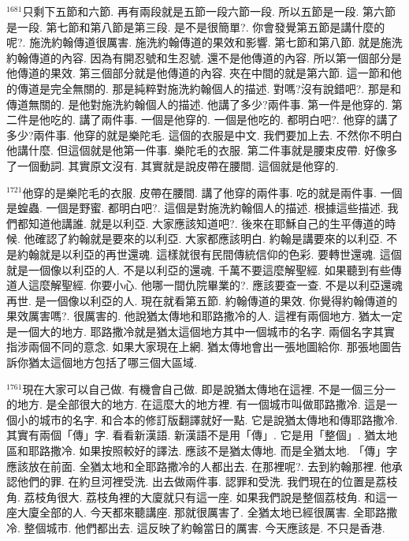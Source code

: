 \documentclass{book}
\begin{document}
$^{1681}$只剩下五節和六節.
再有兩段就是五節一段六節一段.
所以五節是一段.
第六節是一段.
第七節和第八節是第三段.
是不是很簡單?.
你會發覺第五節是講什麼的呢?.
施洗約翰傳道很厲害.
施洗約翰傳道的果效和影響.
第七節和第八節.
就是施洗約翰傳道的內容.
因為有開忍號和生忍號.
還不是他傳道的內容.
所以第一個部分是他傳道的果效.
第三個部分就是他傳道的內容.
夾在中間的就是第六節.
這一節和他的傳道是完全無關的.
那是純粹對施洗約翰個人的描述.
對嗎?沒有說錯吧?.
那是和傳道無關的.
是他對施洗約翰個人的描述.
他講了多少?兩件事.
第一件是他穿的.
第二件是他吃的.
講了兩件事.
一個是他穿的.
一個是他吃的.
都明白吧?.
他穿的講了多少?兩件事.
他穿的就是樂陀毛.
這個的衣服是中文.
我們要加上去.
不然你不明白他講什麼.
但這個就是他第一件事.
樂陀毛的衣服.
第二件事就是腰束皮帶.
好像多了一個動詞.
其實原文沒有.
其實就是說皮帶在腰間.
這個就是他穿的.

$^{1721}$他穿的是樂陀毛的衣服.
皮帶在腰間.
講了他穿的兩件事.
吃的就是兩件事.
一個是蝗蟲.
一個是野蜜.
都明白吧?.
這個是對施洗約翰個人的描述.
根據這些描述.
我們都知道他講誰.
就是以利亞.
大家應該知道吧?.
後來在耶穌自己的生平傳道的時候.
他確認了約翰就是要來的以利亞.
大家都應該明白.
約翰是講要來的以利亞.
不是約翰就是以利亞的再世還魂.
這樣就很有民間傳統信仰的色彩.
要轉世還魂.
這個就是一個像以利亞的人.
不是以利亞的還魂.
千萬不要這麼解聖經.
如果聽到有些傳道人這麼解聖經.
你要小心.
他哪一間仇院畢業的?.
應該要查一查.
不是以利亞還魂再世.
是一個像以利亞的人.
現在就看第五節.
約翰傳道的果效.
你覺得約翰傳道的果效厲害嗎?.
很厲害的.
他說猶太傳地和耶路撒冷的人.
這裡有兩個地方.
猶太一定是一個大的地方.
耶路撒冷就是猶太這個地方其中一個城市的名字.
兩個名字其實指涉兩個不同的意念.
如果大家現在上網.
猶太傳地會出一張地圖給你.
那張地圖告訴你猶太這個地方包括了哪三個大區域.

$^{1761}$現在大家可以自己做.
有機會自己做.
即是說猶太傳地在這裡.
不是一個三分一的地方.
是全部很大的地方.
在這麼大的地方裡.
有一個城市叫做耶路撒冷.
這是一個小的城市的名字.
和合本的修訂版翻譯就好一點.
它是說猶太傳地和傳耶路撒冷.
其實有兩個「傳」字.
看看新漢語.
新漢語不是用「傳」.
它是用「整個」.
猶太地區和耶路撒冷.
如果按照較好的譯法.
應該不是猶太傳地.
而是全猶太地.
「傳」字應該放在前面.
全猶太地和全耶路撒冷的人都出去.
在那裡呢?.
去到約翰那裡.
他承認他們的罪.
在約旦河裡受洗.
出去做兩件事.
認罪和受洗.
我們現在的位置是荔枝角.
荔枝角很大.
荔枝角裡的大廈就只有這一座.
如果我們說是整個荔枝角.
和這一座大廈全部的人.
今天都來聽講座.
那就很厲害了.
全猶太地已經很厲害.
全耶路撒冷.
整個城市.
他們都出去.
這反映了約翰當日的厲害.
今天應該是.
不只是香港.
\end{document}
